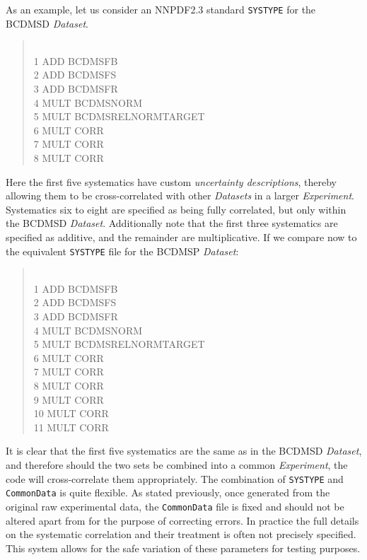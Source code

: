 \documentclass[11pt]{article}
\begin{document}
As an example, let us consider an NNPDF2.3 standard {\tt SYSTYPE} for the BCDMSD \emph{Dataset}.
\begin{quotation}\\
1    ADD    BCDMSFB\\
2    ADD    BCDMSFS\\
3    ADD    BCDMSFR\\
4    MULT    BCDMSNORM\\
5    MULT    BCDMSRELNORMTARGET\\
6    MULT    CORR\\
7    MULT    CORR\\
8    MULT    CORR
\end{quotation}
Here the first five systematics have custom \emph{uncertainty descriptions}, thereby allowing them to be cross-correlated with other \emph{Datasets} in a larger \emph{Experiment}. Systematics six to eight are specified as being fully correlated, but only within the BCDMSD  \emph{Dataset}. Additionally note that the first three systematics are specified as additive, and the remainder are multiplicative. If we compare now to the equivalent {\tt SYSTYPE} file for the BCDMSP \emph{Dataset}:
\begin{quotation}\\
1    ADD    BCDMSFB\\
2    ADD    BCDMSFS\\
3    ADD    BCDMSFR\\
4    MULT    BCDMSNORM\\
5    MULT    BCDMSRELNORMTARGET\\
6    MULT    CORR\\
7    MULT    CORR\\
8    MULT    CORR\\
9    MULT    CORR\\
10    MULT    CORR\\
11    MULT    CORR
\end{quotation}
It is clear that the first five systematics are the same as in the BCDMSD \emph{Dataset}, and therefore should the two sets be combined into a common \emph{Experiment}, the code will cross-correlate them appropriately. The combination of {\tt SYSTYPE} and {\tt CommonData} is quite flexible. As stated previously, once generated from the original raw experimental data, the {\tt CommonData} file is fixed and should not be altered apart from for the purpose of correcting errors. In practice the full details on the systematic correlation and their treatment is often not precisely specified. This system allows for the safe variation of these parameters for testing purposes.
\end{document}
